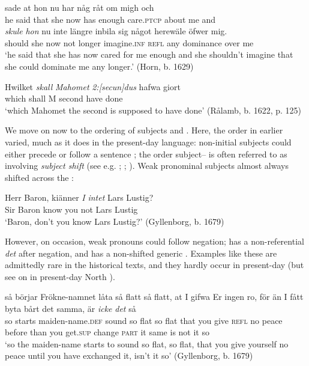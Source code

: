 \documentclass[output=paper]{langscibook}
\begin{document}
\ea\label{ex:intro:12}
\ea\label{ex:intro:12a}
\gll  [han] sade at     hon   nu   har     någ    råt     om   migh och \\
he   said   that she   now has   enough   care.\textsc{ptcp}   about   me     and\\

\gll  \textit{skule}   \textit{hon} nu   inte längre inbila       sig   något herewäle  öfwer   mig.\\
    should   she   now   not longer   imagine.\textsc{inf}   \textsc{refl}   any   dominance   over   me \\
\glt `he said that she has now cared for me enough and she shouldn’t imagine that she could dominate me any longer.’ (Horn, b. 1629)

\ex\label{ex:intro:12b}
\gll  Hwilket \textit{skall}   \textit{Mahomet} \textit{2:[secun]dus} hafwa   giort \\
      which   shall   M         second       have       done\\
    \glt ‘which Mahomet the second is supposed to have done’ (Rålamb, b. 1622, p. 125)
\z
\z

We move on now to the ordering of subjects and . Here, the order in earlier  varied, much as it does in the present-day language: non-initial subjects could either precede or follow a sentence ; the order subject– is often referred to as involving \textit{subject shift} (see e.g. \citealt{Holmberg1993}; \citealt{Svenonius2002}; \citealt{Andreasson2007}). Weak pronominal subjects almost always shifted across the :


\ea\label{ex:intro:13}
\gll  Herr Baron,   kiänner \textit{I} \textit{intet} Lars Lustig? \\
Sir      Baron  know    you not     Lars Lustig\\
\glt ‘Baron, don’t you know Lars Lustig?’ (Gyllenborg, b. 1679)
\z


However, on occasion, weak pronouns could follow negation;  has a non-referential \textit{det} after negation, and  has a non-shifted generic . Examples like these are admittedly rare in the historical texts, and they hardly occur in present-day  (but see \citealt{Bentzen2014} on  in present-day North ).


\ea\label{ex:intro:14}
\ea\label{ex:intro:14a}
\gll  så börjar   Frökne-namnet     låta       så flatt så flatt,   at   I     gifwa   Er ingen ro,     för     än   I       fått       byta     bårt det samma, är \textit{icke} \textit{det} så\\
  so starts   maiden-name.\textsc{def}    sound   so flat   so flat   that you   give   \textsc{refl} no       peace   before than you   get\textsc{.sup} change \textsc{part}   it same is   not     it     so\\
\glt ‘so the maiden-name starts to sound so flat, so flat, that you give yourself no peace until you have exchanged it, isn’t it so’ (Gyllenborg, b. 1679)
\end{document}
